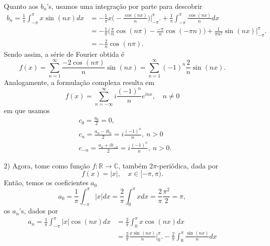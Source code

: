 \documentclass[../pde_notes.tex]{subfiles}
\begin{document}
\begin{example}
\begin{itemize}
		      Quanto aos \(b_{n}\)'s, usamos uma integração por parte para descobrir
		      \begin{align*}
			      b_{n} = \frac{1}{\pi }\int_{-\pi }^{\pi }x\sin^{}{(nx)}dx & = -\frac{1}{\pi } x \biggl(-\frac{\cos^{}{(nx)}}{n}\biggr)\biggl|_{-\pi }^{\pi }\biggr. + \frac{1}{\pi }\int_{-\pi }^{\pi }\frac{\cos^{}{(nx)}}{n}dx             \\
			                                                                & = -\frac{1}{\pi }\biggl(\frac{\pi }{n}\cos^{}{(n\pi )} - \frac{-\pi }{n}\cos^{}{(-\pi n)}\biggr) + \frac{1}{\pi n^{2}}\sin^{}{(nx)}\biggl|_{-\pi }^{\pi }\biggr. \\
			                                                                & = -\frac{2}{n}\cos^{}{(n\pi )}.
		      \end{align*}
		      Sendo assim, a série de Fourier obtida é
		      \[
			      f(x) = \sum\limits_{n=1}^{\infty}\frac{-2\cos^{}{(n\pi )}}{n}\sin^{}{(nx)} = \sum\limits_{n=1}^{\infty}(-1)^{n}\frac{2}{n}\sin^{}{(nx)}.
		      \]
		      Analogamente, a formulação complexa  resulta em
		      \[
			      f(x) = \sum\limits_{n=-\infty}^{\infty}i \frac{(-1)^{n}}{n}e^{inx},\quad n\neq 0
		      \]
		      em que usamos
		      \begin{align*}
			       & c_{0} = \frac{a_{0}}{2} = 0,                                      \\
			       & c_{n} = \frac{a_{n}-ib_{n}}{2} = i \frac{(-1)^{n}}{n}, \: n > 0   \\
			       & c_{-n} = \frac{a_n + ib_{-n}}{2} = i \frac{(-1)^{n}}{n},\: n > 0.
		      \end{align*}
		\item[2)] Agora, tome como função \(f:\mathbb{R}\rightarrow \mathbb{C}\), também \(2\pi \)-periódica, dada por
		      \[
			      f(x)=|x|,\quad x\in [-\pi , \pi ).
		      \]
		      Então, temos os coeficientes \(a_{0}\)
		      \[
			      a_{0} = \frac{1}{\pi }\int_{-\pi }^{\pi }|x|dx = \frac{2}{\pi }\int_{0}^{\pi }xdx = \frac{2}{\pi }\frac{\pi^{2}}{2} = \pi,
		      \]
		      os \(a_{n}\)'s, dados por
		      \begin{align*}
			      a_{n} = \frac{1}{\pi }\int_{-\pi }^{\pi }|x|\cos^{}{(nx)}dx & = \frac{2}{\pi }\int_{0}^{\pi }x\cos^{}{(nx)}dx                                                                            \\
			                                                                  & = \frac{2}{\pi }\frac{x\sin^{}{(nx)}}{n}\biggl|_{0}^{\pi }\biggr. - \frac{2}{\pi }\int_{0}^{\pi }\frac{\sin^{}{(nx)}}{n}dx \\

\end{align*}
\end{itemize}
\end{example}
\end{document}
